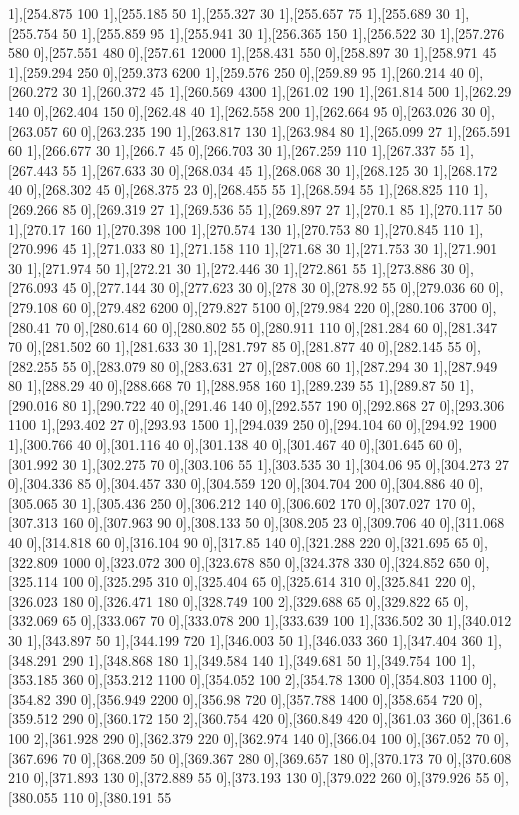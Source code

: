 {1],[254.875 100 1],[255.185 50 1],[255.327 30 1],[255.657 75 1],[255.689 30 1],[255.754 50 1],[255.859 95 1],[255.941 30 1],[256.365 150 1],[256.522 30 1],[257.276 580 0],[257.551 480 0],[257.61 12000 1],[258.431 550 0],[258.897 30 1],[258.971 45 1],[259.294 250 0],[259.373 6200 1],[259.576 250 0],[259.89 95 1],[260.214 40 0],[260.272 30 1],[260.372 45 1],[260.569 4300 1],[261.02 190 1],[261.814 500 1],[262.29 140 0],[262.404 150 0],[262.48 40 1],[262.558 200 1],[262.664 95 0],[263.026 30 0],[263.057 60 0],[263.235 190 1],[263.817 130 1],[263.984 80 1],[265.099 27 1],[265.591 60 1],[266.677 30 1],[266.7 45 0],[266.703 30 1],[267.259 110 1],[267.337 55 1],[267.443 55 1],[267.633 30 0],[268.034 45 1],[268.068 30 1],[268.125 30 1],[268.172 40 0],[268.302 45 0],[268.375 23 0],[268.455 55 1],[268.594 55 1],[268.825 110 1],[269.266 85 0],[269.319 27 1],[269.536 55 1],[269.897 27 1],[270.1 85 1],[270.117 50 1],[270.17 160 1],[270.398 100 1],[270.574 130 1],[270.753 80 1],[270.845 110 1],[270.996 45 1],[271.033 80 1],[271.158 110 1],[271.68 30 1],[271.753 30 1],[271.901 30 1],[271.974 50 1],[272.21 30 1],[272.446 30 1],[272.861 55 1],[273.886 30 0],[276.093 45 0],[277.144 30 0],[277.623 30 0],[278 30 0],[278.92 55 0],[279.036 60 0],[279.108 60 0],[279.482 6200 0],[279.827 5100 0],[279.984 220 0],[280.106 3700 0],[280.41 70 0],[280.614 60 0],[280.802 55 0],[280.911 110 0],[281.284 60 0],[281.347 70 0],[281.502 60 1],[281.633 30 1],[281.797 85 0],[281.877 40 0],[282.145 55 0],[282.255 55 0],[283.079 80 0],[283.631 27 0],[287.008 60 1],[287.294 30 1],[287.949 80 1],[288.29 40 0],[288.668 70 1],[288.958 160 1],[289.239 55 1],[289.87 50 1],[290.016 80 1],[290.722 40 0],[291.46 140 0],[292.557 190 0],[292.868 27 0],[293.306 1100 1],[293.402 27 0],[293.93 1500 1],[294.039 250 0],[294.104 60 0],[294.92 1900 1],[300.766 40 0],[301.116 40 0],[301.138 40 0],[301.467 40 0],[301.645 60 0],[301.992 30 1],[302.275 70 0],[303.106 55 1],[303.535 30 1],[304.06 95 0],[304.273 27 0],[304.336 85 0],[304.457 330 0],[304.559 120 0],[304.704 200 0],[304.886 40 0],[305.065 30 1],[305.436 250 0],[306.212 140 0],[306.602 170 0],[307.027 170 0],[307.313 160 0],[307.963 90 0],[308.133 50 0],[308.205 23 0],[309.706 40 0],[311.068 40 0],[314.818 60 0],[316.104 90 0],[317.85 140 0],[321.288 220 0],[321.695 65 0],[322.809 1000 0],[323.072 300 0],[323.678 850 0],[324.378 330 0],[324.852 650 0],[325.114 100 0],[325.295 310 0],[325.404 65 0],[325.614 310 0],[325.841 220 0],[326.023 180 0],[326.471 180 0],[328.749 100 2],[329.688 65 0],[329.822 65 0],[332.069 65 0],[333.067 70 0],[333.078 200 1],[333.639 100 1],[336.502 30 1],[340.012 30 1],[343.897 50 1],[344.199 720 1],[346.003 50 1],[346.033 360 1],[347.404 360 1],[348.291 290 1],[348.868 180 1],[349.584 140 1],[349.681 50 1],[349.754 100 1],[353.185 360 0],[353.212 1100 0],[354.052 100 2],[354.78 1300 0],[354.803 1100 0],[354.82 390 0],[356.949 2200 0],[356.98 720 0],[357.788 1400 0],[358.654 720 0],[359.512 290 0],[360.172 150 2],[360.754 420 0],[360.849 420 0],[361.03 360 0],[361.6 100 2],[361.928 290 0],[362.379 220 0],[362.974 140 0],[366.04 100 0],[367.052 70 0],[367.696 70 0],[368.209 50 0],[369.367 280 0],[369.657 180 0],[370.173 70 0],[370.608 210 0],[371.893 130 0],[372.889 55 0],[373.193 130 0],[379.022 260 0],[379.926 55 0],[380.055 110 0],[380.191 55 }
